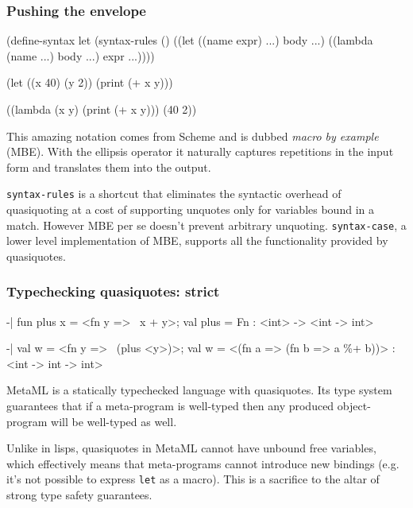 \documentclass[hyperref={bookmarks=false}]{beamer}
\begin{document}
\begin{frame}[fragile]
\frametitle{Pushing the envelope}

\begin{lstlistinglike}
\begin{semiverbatim}
(define-syntax let
  (syntax-rules ()
    ((let ((name expr) ...) body ...)
     ((lambda (name ...) body ...) expr ...))))

(let ((x 40) (y 2)) (print (+ x y)))

((lambda (x y) (print (+ x y))) (40 2))
\end{semiverbatim}
\end{lstlistinglike}

This amazing notation comes from Scheme and is dubbed \emph{macro by example} (MBE).
With the ellipsis operator it naturally captures repetitions in the input form
and translates them into the output.

\texttt{syntax-rules} is a shortcut that eliminates the syntactic overhead of quasiquoting at a cost
of supporting unquotes only for variables bound in a match. However MBE per se doesn't prevent
arbitrary unquoting. \texttt{syntax-case}, a lower level implementation of MBE, supports all the
functionality provided by quasiquotes.
\end{frame}

\begin{frame}[fragile]
\frametitle{Typechecking quasiquotes: strict}

\begin{lstlistinglike}
\begin{semiverbatim}
-| fun plus x = <fn y => ~x + y>;
val plus = Fn : <int> -> <int -> int>

-| val w = <fn y => ~(plus <y>)>;
val w = <(fn a => (fn b => a \%+ b))> : <int -> int -> int>
\end{semiverbatim}
\end{lstlistinglike}

MetaML is a statically typechecked language with quasiquotes. Its type system guarantees that
if a meta-program is well-typed then any produced object-program will be well-typed as well.

Unlike in lisps, quasiquotes in MetaML cannot have unbound free variables, which effectively means
that meta-programs cannot introduce new bindings (e.g. it's not possible to express \texttt{let} as a macro).
This is a sacrifice to the altar of strong type safety guarantees.
\end{frame}
\end{document}

